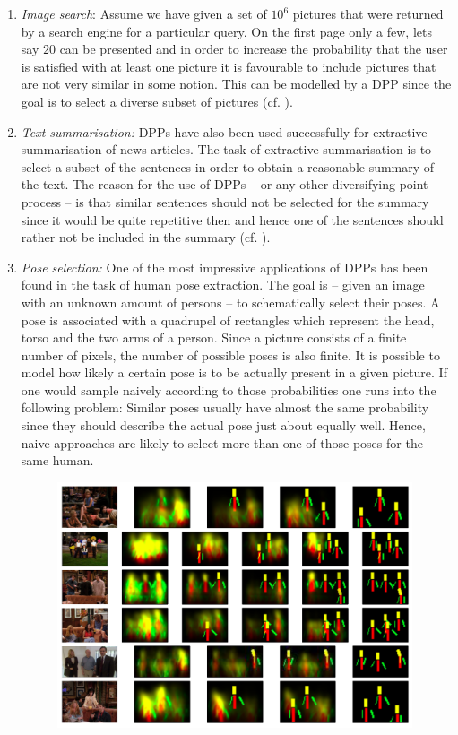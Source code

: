 \begin{enumerate}
\item \emph{Image search}: Assume we have given a set of \(10^6\) pictures that were returned by a search engine for a particular query. On the first page only a few, lets say \(20\) can be presented and in order to increase the probability that the user is satisfied with at least one picture it is favourable to include pictures that are not very similar in some notion. This can be modelled by a DPP since the goal is to select a diverse subset of pictures (cf. \cite{kulesza2011k}). %
\item \emph{Text summarisation:} DPPs have also been used successfully for extractive summarisation of news articles. The task of extractive summarisation is to select a subset of the sentences in order to obtain a reasonable summary of the text. The reason for the use of DPPs -- or any other diversifying point process -- is that similar sentences should not be selected for the summary since it would be quite repetitive then and hence one of the sentences should rather not be included in the summary (cf. \cite{kulesza2012learning1}). 
\item \emph{Pose selection:} One of the most impressive applications of DPPs has been found in the task of human pose extraction. The goal is -- given an image with an unknown amount of persons -- to schematically select their poses. A pose is associated with a quadrupel of rectangles which represent the head, torso and the two arms of a person. Since a picture consists of a finite number of pixels, the number of possible poses is also finite. It is possible to model how likely a certain pose is to be actually present in a given picture. If one would sample naively according to those probabilities one runs into the following problem: Similar poses usually have almost the same probability since they should describe the actual pose just about equally well. Hence, naive approaches are likely to select more than one of those poses for the same human.
\begin{figure}[h!]
	\centering
	\includegraphics[width=0.99\textwidth]{figures/pose-estimation}

\end{figure}
\end{enumerate}
